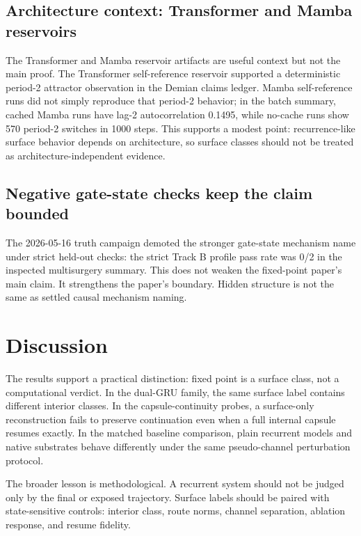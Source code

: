 \documentclass[11pt]{article}
\begin{document}
\subsection{Architecture context: Transformer and Mamba reservoirs}

The Transformer and Mamba reservoir artifacts are useful context but not the
main proof. The Transformer self-reference reservoir supported a deterministic
period-2 attractor observation in the Demian claims ledger. Mamba
self-reference runs did not simply reproduce that period-2 behavior; in the
batch summary, cached Mamba runs have lag-2 autocorrelation 0.1495, while
no-cache runs show 570 period-2 switches in 1000 steps. This supports a
modest point: recurrence-like surface behavior depends on architecture, so
surface classes should not be treated as architecture-independent evidence.

\subsection{Negative gate-state checks keep the claim bounded}

The 2026-05-16 truth campaign demoted the stronger gate-state mechanism name
under strict held-out checks: the strict Track B profile pass rate was 0/2 in
the inspected multisurgery summary. This does not weaken the fixed-point
paper's main claim. It strengthens the paper's boundary. Hidden structure is
not the same as settled causal mechanism naming.

\section{Discussion}

The results support a practical distinction: fixed point is a surface class,
not a computational verdict. In the dual-GRU family, the same surface label
contains different interior classes. In the capsule-continuity probes, a
surface-only reconstruction fails to preserve continuation even when a full
internal capsule resumes exactly. In the matched baseline comparison, plain
recurrent models and native substrates behave differently under the same
pseudo-channel perturbation protocol.

The broader lesson is methodological. A recurrent system should not be judged
only by the final or exposed trajectory. Surface labels should be paired with
state-sensitive controls: interior class, route norms, channel separation,
ablation response, and resume fidelity.
\end{document}
